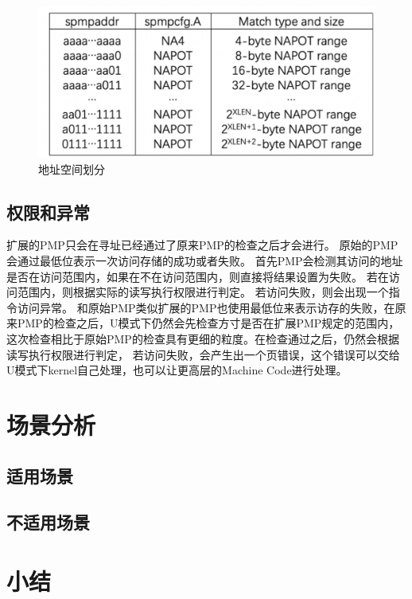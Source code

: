 \begin{figure}
    \centering
    \includegraphics[scale=0.40]{Figures/extend/address.png}
    \decoRule
    \caption{地址空间划分}
    \label{fig:address}
\end{figure}

\subsection{权限和异常}
扩展的PMP只会在寻址已经通过了原来PMP的检查之后才会进行。
原始的PMP会通过最低位表示一次访问存储的成功或者失败。
首先PMP会检测其访问的地址是否在访问范围内，如果在不在访问范围内，则直接将结果设置为失败。
若在访问范围内，则根据实际的读写执行权限进行判定。
若访问失败，则会出现一个指令访问异常。
和原始PMP类似扩展的PMP也使用最低位来表示访存的失败，在原来PMP的检查之后，U模式下仍然会先检查方寸是否在扩展PMP规定的范围内，
这次检查相比于原始PMP的检查具有更细的粒度。在检查通过之后，仍然会根据读写执行权限进行判定，
若访问失败，会产生出一个页错误，这个错误可以交给U模式下kernel自己处理，也可以让更高层的Machine Code进行处理。


\section{场景分析}
\subsection{适用场景}
\subsection{不适用场景}

\section{小结}